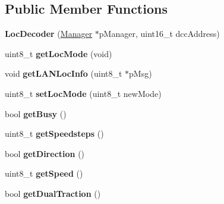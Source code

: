 \subsection*{Public Member Functions}
\begin{DoxyCompactItemize}
\item 
\mbox{\label{classTBT_1_1LocDecoder_ae8563de74c15f27c40644bf8218d26d9}} 
{\bfseries Loc\+Decoder} (\hyperlink{classTBT_1_1Manager}{Manager} $\ast$p\+Manager, uint16\+\_\+t dcc\+Address)
\item 
\mbox{\label{classTBT_1_1LocDecoder_afaa04ad0561a39212d69d0aabece751e}} 
uint8\+\_\+t {\bfseries get\+Loc\+Mode} (void)
\item 
\mbox{\label{classTBT_1_1LocDecoder_a257c294961f07e5f2134b1550355a661}} 
void {\bfseries get\+L\+A\+N\+Loc\+Info} (uint8\+\_\+t $\ast$p\+Msg)
\item 
\mbox{\label{classTBT_1_1LocDecoder_a0ed2026cd64ba1e2aa411e1228027f4e}} 
uint8\+\_\+t {\bfseries set\+Loc\+Mode} (uint8\+\_\+t new\+Mode)
\item 
\mbox{\label{classTBT_1_1LocDecoder_a3ec11c7c270d1eeb00e6893bff8f0831}} 
bool {\bfseries get\+Busy} ()
\item 
\mbox{\label{classTBT_1_1LocDecoder_ae89a770202444bca60595182fe4a9c90}} 
uint8\+\_\+t {\bfseries get\+Speedsteps} ()
\item 
\mbox{\label{classTBT_1_1LocDecoder_a5c570e65adde5ee526986155d509da47}} 
bool {\bfseries get\+Direction} ()
\item 
\mbox{\label{classTBT_1_1LocDecoder_a7305c8ab02a76b48b2b5ab93f1aec24b}} 
uint8\+\_\+t {\bfseries get\+Speed} ()
\item 
\mbox{\label{classTBT_1_1LocDecoder_a7f4c04a5a306ea827494b29789cc401e}} 
bool {\bfseries get\+Dual\+Traction} ()
\item 
\mbox{\label{classTBT_1_1LocDecoder_ab0a2b2953657fbc2589f90918883d03a}} 

\end{DoxyCompactItemize}
